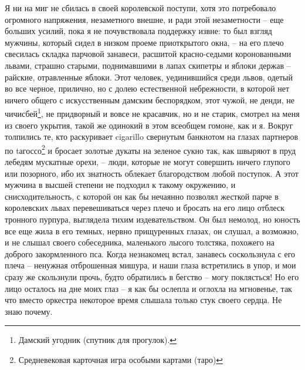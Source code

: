 Я ни  на миг не  сбилась в своей  королевской поступи, хотя  это потребовало
огромного напряжения,  незаметного внешне, и  ради этой незаметности  -- еще
больших  усилий, пока  я не  почувствовала  поддержку извне:  то был  взгляд
мужчины, который  сидел в низком проеме  приоткрытого окна, -- на  его плечо
свесилась  складка парчовой  занавеси, расшитой  красно-седыми коронованными
львами, страшно  старыми, поднимавшими в  лапах скипетры и яблоки  держав --
райские, отравленные яблоки. Этот  человек, уединившийся среди львов, одетый
во все черное, прилично, но с  долею естественной небрежности, в которой нет
ничего общего с искусственным дамским  беспорядком, этот чужой, не денди, не
чичисбей\footnote{Дамский угодник (спутник для  прогулок).}, не придворный и
вовсе не красавчик, но и не старик, смотрел на меня из своего укрытия, такой
же  одинокий  в  этом  всеобщем  гомоне,  как  и  я.  Вокруг  толпились  те,
кто  раскуривает  cigarillo  свернутым  банкнотом  на  глазах  партнеров  по
tагоссо\footnote{Средневековая  карточная  игра  особыми картами  (таро)}  и
бросает золотые  дукаты на  зеленое сукно  так, как  швыряют в  пруд лебедям
мускатные  орехи,  --  люди,  которые  не  могут  совершить  ничего  глупого
или  позорного,  ибо их  знатность  облекает  благородством любой  поступок.
А  этот  мужчина  в  высшей  степени  не  подходил  к  такому  окружению,  и
снисходительность, с  которой он  как бы нечаянно  позволял жесткой  парче в
королевских львах перевешиваться  через плечо и бросать на  его лицо отблеск
тронного пурпура, выглядела тихим издевательством. Он был немолод, но юность
все еще жила в его темных, нервно прищуренных глазах, он слушал, а возможно,
и  не слышал  своего собеседника,  маленького лысого  толстяка, похожего  на
доброго закормленного  пса. Когда незнакомец встал,  занавесь соскользнула с
его плеча --  ненужная отброшенная мишура, и наши глаза  встретились в упор,
и  мои  сразу же  скользнули  прочь,  будто  обратились  в бегство  --  могу
поклясться! Но  его лицо осталось  на дне  моих глаз --  я как бы  ослепла и
оглохла на мгновенье, так что вместо оркестра некоторое время слышала только
стук своего сердца. Не знаю почему.

